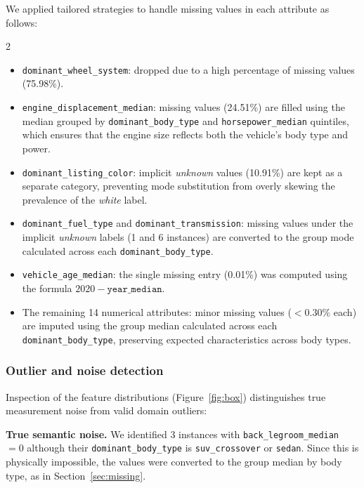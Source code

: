 \documentclass[11pt,a4paper]{article}
\numberwithin{table}{section}
\numberwithin{figure}{section}
\begin{document}
We applied tailored strategies to handle missing values in each attribute as follows:
\begin{multicols}{2}
\raggedright
\begin{itemize}[leftmargin=*]
  \item \texttt{dominant\_wheel\_system}: dropped due to a high percentage of missing values (75.98\%).
  \item \texttt{engine\_displacement\_median}: missing values (24.51\%) are filled using the median grouped by \texttt{dominant\_body\_type} and \texttt{horsepower\_median} quintiles, which ensures that the engine size reflects both the vehicle's body type and power.
  \item \texttt{dominant\_listing\_color}: implicit \textit{unknown} values (10.91\%) are kept as a separate category, preventing mode substitution from overly skewing the prevalence of the \textit{white} label.
  \item \texttt{dominant\_fuel\_type} and \texttt{dominant\_transmission}: missing values under the implicit \textit{unknown} labels (1 and 6 instances) are converted to the group mode calculated across each \texttt{dominant\_body\_type}.
  \item \texttt{vehicle\_age\_median}: the single missing entry (0.01\%) was computed using the formula $2020 - \texttt{year\_median}$.
  \item The remaining 14 numerical attributes: minor missing values ($<0.30\%$ each) are imputed using the group median calculated across each \texttt{dominant\_body\_type}, preserving expected characteristics across body types.
\end{itemize}
\end{multicols}

\subsubsection{Outlier and noise detection}
\label{sec:outliers}
Inspection of the feature distributions (Figure~\ref{fig:box}) distinguishes true measurement noise from valid domain outliers:

\textbf{True semantic noise.} We identified 3 instances with \texttt{back\_legroom\_median} $=0$ although their \texttt{dominant\_body\_type} is \texttt{suv\_crossover} or \texttt{sedan}. Since this is physically impossible, the values were converted to the group median by body type, as in Section~\ref{sec:missing}.
\end{document}
